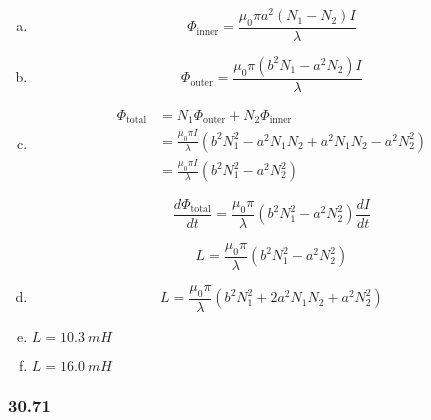 \documentclass{article}
\begin{document}
\begin{enumerate}[(a)]
  \item \[\Phi_\text{inner} = \frac{\mu_0 \pi a^2 (N_1 - N_2) I}{\lambda}\]

  \item \[\Phi_\text{outer} = \frac{\mu_0 \pi (b^2 N_1 - a^2 N_2) I}{\lambda}\]

  \item

        \begin{align*}
          \Phi_\text{total} & = N_1 \Phi_\text{outer} + N_2 \Phi_\text{inner}                                   \\
                            & = \frac{\mu_0 \pi I}{\lambda} (b^2 N_1^2 - a^2 N_1 N_2 + a^2 N_1 N_2 - a^2 N_2^2) \\
                            & = \frac{\mu_0 \pi I}{\lambda} (b^2 N_1^2 - a^2 N_2^2)
        \end{align*}

        \[\frac{d \Phi_\text{total}}{dt} = \frac{\mu_0 \pi}{\lambda} (b^2 N_1^2 - a^2 N_2^2) \frac{dI}{dt}\]

        \[L = \frac{\mu_0 \pi}{\lambda} (b^2 N_1^2 - a^2 N_2^2)\]

  \item \[L = \frac{\mu_0 \pi}{\lambda} (b^2 N_1^2 + 2 a^2 N_1 N_2 + a^2 N_2^2)\]

  \item $L = \qty{10.3}{mH}$

  \item $L = \qty{16.0}{mH}$
\end{enumerate}

\subsubsection{30.71}
\end{document}
